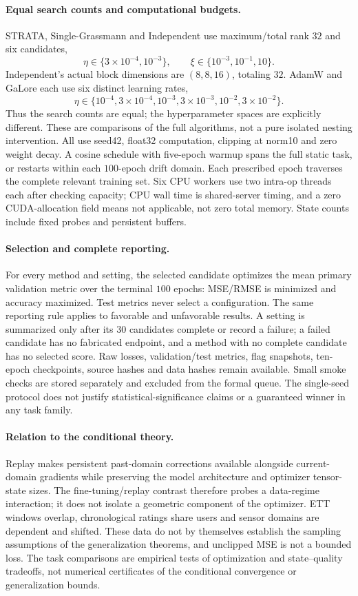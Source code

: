 \paragraph{Equal search counts and computational budgets.}
STRATA, Single-Grassmann and Independent use maximum/total rank $32$ and six candidates,
\[
 \eta\in\{3\times10^{-4},10^{-3}\},\qquad
 \xi\in\{10^{-3},10^{-1},10\}.
\]
Independent's actual block dimensions are $(8,8,16)$, totaling $32$. AdamW and GaLore each use six distinct learning rates,
\[
 \eta\in\{10^{-4},3\times10^{-4},10^{-3},3\times10^{-3},10^{-2},3\times10^{-2}\}.
\]
Thus the search counts are equal; the hyperparameter spaces are explicitly different. These are comparisons of the full algorithms, not a pure isolated nesting intervention. All use seed42, float32 computation, clipping at norm10 and zero weight decay. A cosine schedule with five-epoch warmup spans the full static task, or restarts within each $100$-epoch drift domain. Each prescribed epoch traverses the complete relevant training set. Six CPU workers use two intra-op threads each after checking capacity; CPU wall time is shared-server timing, and a zero CUDA-allocation field means not applicable, not zero total memory. State counts include fixed probes and persistent buffers.

\paragraph{Selection and complete reporting.}
For every method and setting, the selected candidate optimizes the mean primary validation metric over the terminal $100$ epochs: MSE/RMSE is minimized and accuracy maximized. Test metrics never select a configuration. The same reporting rule applies to favorable and unfavorable results. A setting is summarized only after its $30$ candidates complete or record a failure; a failed candidate has no fabricated endpoint, and a method with no complete candidate has no selected score. Raw losses, validation/test metrics, flag snapshots, ten-epoch checkpoints, source hashes and data hashes remain available. Small smoke checks are stored separately and excluded from the formal queue. The single-seed protocol does not justify statistical-significance claims or a guaranteed winner in any task family.

\paragraph{Relation to the conditional theory.}
Replay makes persistent past-domain corrections available alongside current-domain gradients while preserving the model architecture and optimizer tensor-state sizes. The fine-tuning/replay contrast therefore probes a data-regime interaction; it does not isolate a geometric component of the optimizer. ETT windows overlap, chronological ratings share users and sensor domains are dependent and shifted. These data do not by themselves establish the sampling assumptions of the generalization theorems, and unclipped MSE is not a bounded loss. The task comparisons are empirical tests of optimization and state--quality tradeoffs, not numerical certificates of the conditional convergence or generalization bounds.
